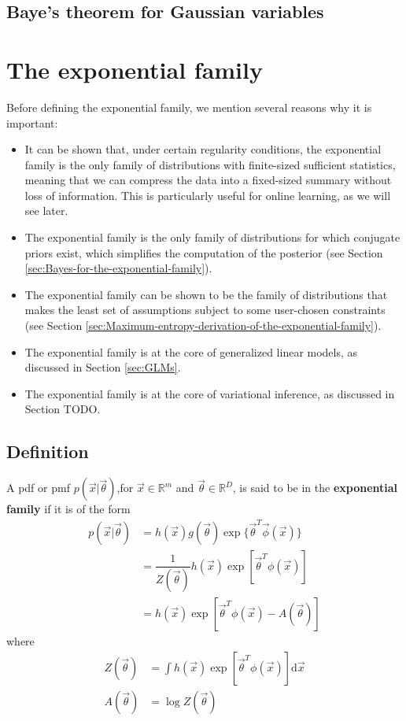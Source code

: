 \subsection{Baye's theorem for Gaussian variables}

\section{The exponential family}
\label{sec:exponential-family}

Before defining the exponential family, we mention several reasons why it is important:
\begin{itemize}
	\item{It can be shown that, under certain regularity conditions, the exponential family is the only family of distributions with finite-sized sufficient statistics, meaning that we can compress the data into a fixed-sized summary without loss of information. This is particularly useful for online learning, as we will see later.}
	\item{The exponential family is the only family of distributions for which conjugate priors exist, which simplifies the computation of the posterior (see Section \ref{sec:Bayes-for-the-exponential-family}).}
	\item{The exponential family can be shown to be the family of distributions that makes the least set of assumptions subject to some user-chosen constraints (see Section \ref{sec:Maximum-entropy-derivation-of-the-exponential-family}).}
	\item{The exponential family is at the core of generalized linear models, as discussed in Section \ref{sec:GLMs}.}
	\item{The exponential family is at the core of variational inference, as discussed in Section TODO.}
\end{itemize}


\subsection{Definition}
A pdf or pmf $p(\vec{x}|\vec{\theta})$,for $\vec{x} \in \mathbb{R}^m$ and $\vec{\theta} \in \mathbb{R}^D$, is said to be in the \textbf{exponential family} if it is of the form
\begin{align}
p(\vec{x}|\vec{\theta}) 
&= h(\vec{x})g(\vec{\theta})\exp\{\vec{\theta}^T\vec{\phi}(\vec{x})\} \\
&=\dfrac{1}{Z(\vec{\theta})}h(\vec{x})\exp[\vec{\theta}^T\phi(\vec{x})] \\
& = h(\vec{x})\exp[\vec{\theta}^T\phi(\vec{x})-A(\vec{\theta})] \label{eqn:exponential-family}
\end{align}
where
\begin{align}
Z(\vec{\theta}) & =\int h(\vec{x})\exp[\vec{\theta}^T\phi(\vec{x})]\mathrm{d}\vec{x} \\
A(\vec{\theta}) & =\log Z(\vec{\theta})
\end{align}

